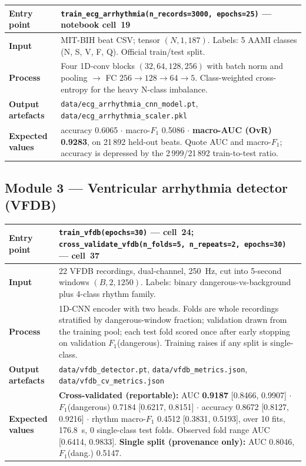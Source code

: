 \documentclass[11pt,a4paper]{article}
\newcommand{\code}[1]{\texttt{\small #1}}
\begin{document}
\begin{table}[!ht]
\centering
\small
\begin{tabular}{@{}p{2.4cm}p{12.4cm}@{}}
\toprule
\textbf{Entry point} & \code{train\_ecg\_arrhythmia(n\_records=3000,
epochs=25)} --- notebook cell~19\\
\midrule
\textbf{Input} & MIT-BIH beat CSV; tensor $(N, 1, 187)$. Labels: 5 AAMI
classes (N, S, V, F, Q). Official train/test split.\\
\addlinespace
\textbf{Process} & Four 1D-conv blocks $(32,64,128,256)$ with batch norm
and pooling $\rightarrow$ FC $256\rightarrow128\rightarrow64\rightarrow5$.
Class-weighted cross-entropy for the heavy N-class imbalance.\\
\addlinespace
\textbf{Output artefacts} & \code{data/ecg\_arrhythmia\_cnn\_model.pt},
\code{data/ecg\_arrhythmia\_scaler.pkl}\\
\addlinespace
\textbf{Expected values} & accuracy 0.6065 $\cdot$ macro-$F_1$ 0.5086
$\cdot$ \textbf{macro-AUC (OvR) 0.9283}, on 21\,892 held-out beats.
Quote AUC and macro-$F_1$; accuracy is depressed by the 2\,999/21\,892
train-to-test ratio.\\
\bottomrule
\end{tabular}
\end{table}

\subsection{Module 3 --- Ventricular arrhythmia detector (VFDB)}

\begin{table}[!ht]
\centering
\small
\begin{tabular}{@{}p{2.4cm}p{12.4cm}@{}}
\toprule
\textbf{Entry point} & \code{train\_vfdb(epochs=30)} --- cell~24;
\code{cross\_validate\_vfdb(n\_folds=5, n\_repeats=2, epochs=30)} ---
cell~37\\
\midrule
\textbf{Input} & 22 VFDB recordings, dual-channel, 250~Hz, cut into
5-second windows $(B, 2, 1250)$. Labels: binary dangerous-vs-background
plus 4-class rhythm family.\\
\addlinespace
\textbf{Process} & 1D-CNN encoder with two heads. Folds are whole
recordings stratified by dangerous-window fraction; validation drawn from
the training pool; each test fold scored once after early stopping on
validation $F_1$(dangerous). Training raises if any split is
single-class.\\
\addlinespace
\textbf{Output artefacts} & \code{data/vfdb\_detector.pt},
\code{data/vfdb\_metrics.json}, \code{data/vfdb\_cv\_metrics.json}\\
\addlinespace
\textbf{Expected values} &
\textbf{Cross-validated (reportable):} AUC \textbf{0.9187}
[0.8466, 0.9907] $\cdot$ $F_1$(dangerous) 0.7184 [0.6217, 0.8151] $\cdot$
accuracy 0.8672 [0.8127, 0.9216] $\cdot$ rhythm macro-$F_1$ 0.4512
[0.3831, 0.5193], over 10 fits, 176.8~s, 0 single-class test folds.
Observed fold range AUC [0.6414, 0.9833].
\textbf{Single split (provenance only):} AUC 0.8046, $F_1$(dang.) 0.5147.\\
\bottomrule
\end{tabular}
\end{table}
\end{document}
